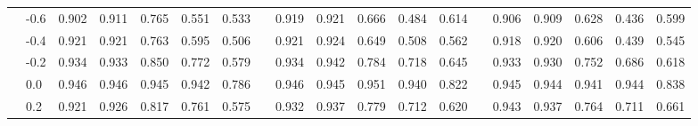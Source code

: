 \begin{table}
{\begin{tabular}{llccccccccccccccccc}
 & -0.6 & \cellcolor[HTML]{E7F5EE}0.902 & \cellcolor[HTML]{DDF2F7}0.911 & \cellcolor[HTML]{FFE69A}0.765 & \cellcolor[HTML]{FEBA6C}0.551 & \cellcolor[HTML]{FEB86A}0.533 & & \cellcolor[HTML]{CEEAF3}0.919 & \cellcolor[HTML]{CBE8F2}0.921 & \cellcolor[HTML]{FED989}0.666 & \cellcolor[HTML]{FEBA6C}0.484 & \cellcolor[HTML]{FFCE7F}0.614 & & \cellcolor[HTML]{D4EDF4}0.906 & \cellcolor[HTML]{D0EBF3}0.909 & \cellcolor[HTML]{FEDA8B}0.628 & \cellcolor[HTML]{FEBD6F}0.436 & \cellcolor[HTML]{FED585}0.599 \\
 & -0.4 & \cellcolor[HTML]{CDE9F2}0.921 & \cellcolor[HTML]{CDE9F2}0.921 & \cellcolor[HTML]{FFE699}0.763 & \cellcolor[HTML]{FEC273}0.595 & \cellcolor[HTML]{FDB466}0.506 & & \cellcolor[HTML]{CBE8F2}0.921 & \cellcolor[HTML]{C5E6F0}0.924 & \cellcolor[HTML]{FED585}0.649 & \cellcolor[HTML]{FEBD6F}0.508 & \cellcolor[HTML]{FEC577}0.562 & & \cellcolor[HTML]{C2E4EF}0.918 & \cellcolor[HTML]{BFE2EE}0.920 & \cellcolor[HTML]{FED687}0.606 & \cellcolor[HTML]{FEBE6F}0.439 & \cellcolor[HTML]{FFCC7D}0.545 \\
 & -0.2 & \cellcolor[HTML]{ADDAE9}0.934 & \cellcolor[HTML]{B0DBEA}0.933 & \cellcolor[HTML]{FFFEBD}0.850 & \cellcolor[HTML]{FFE89C}0.772 & \cellcolor[HTML]{FEBF71}0.579 & & \cellcolor[HTML]{AFDBEA}0.934 & \cellcolor[HTML]{96C8E0}0.942 & \cellcolor[HTML]{FFF0A8}0.784 & \cellcolor[HTML]{FEE395}0.718 & \cellcolor[HTML]{FED485}0.645 & & \cellcolor[HTML]{A2D1E5}0.933 & \cellcolor[HTML]{AAD8E8}0.930 & \cellcolor[HTML]{FFEFA7}0.752 & \cellcolor[HTML]{FEE496}0.686 & \cellcolor[HTML]{FED889}0.618 \\
 & 0.0 & \cellcolor[HTML]{74ADD1}0.946 & \cellcolor[HTML]{74ADD1}0.946 & \cellcolor[HTML]{7BB2D4}0.945 & \cellcolor[HTML]{8DC0DC}0.942 & \cellcolor[HTML]{FFEBA1}0.786 & & \cellcolor[HTML]{85BAD8}0.946 & \cellcolor[HTML]{8ABEDA}0.945 & \cellcolor[HTML]{74ADD1}0.951 & \cellcolor[HTML]{9DCEE3}0.940 & \cellcolor[HTML]{FFF9B6}0.822 & & \cellcolor[HTML]{74ADD1}0.945 & \cellcolor[HTML]{79B1D3}0.944 & \cellcolor[HTML]{87BCD9}0.941 & \cellcolor[HTML]{79B1D3}0.944 & \cellcolor[HTML]{FAFDC9}0.838 \\
 & 0.2 & \cellcolor[HTML]{CDE9F2}0.921 & \cellcolor[HTML]{C2E4EF}0.926 & \cellcolor[HTML]{FFF3AD}0.817 & \cellcolor[HTML]{FFE598}0.761 & \cellcolor[HTML]{FEBE70}0.575 & & \cellcolor[HTML]{B4DDEC}0.932 & \cellcolor[HTML]{A7D6E7}0.937 & \cellcolor[HTML]{FFEEA6}0.779 & \cellcolor[HTML]{FEE293}0.712 & \cellcolor[HTML]{FFCF80}0.620 & & \cellcolor[HTML]{7EB5D5}0.943 & \cellcolor[HTML]{96C8E0}0.937 & \cellcolor[HTML]{FFF1AA}0.764 & \cellcolor[HTML]{FFE89C}0.711 & \cellcolor[HTML]{FEE191}0.661 \\

\end{tabular}}
\end{table}
